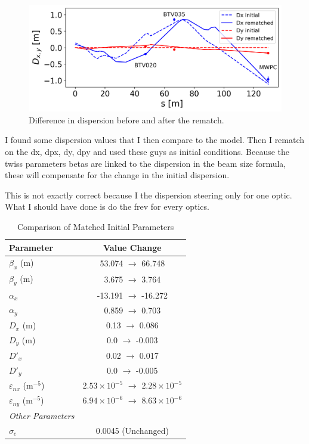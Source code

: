 \documentclass[a4paper,
               biblatex,     %
               ]{jacow}
\begin{document}
\begin{figure}[!htb]
   \centering
   \includegraphics*[width=1.0\columnwidth]{dispersion_diff.png}
   \caption{Difference in dispersion before and after the rematch.}
   \label{fig:dispersion}
\end{figure}

I found some dispersion values that I then compare to the model. Then I rematch on the dx, dpx, dy, dpy and used these guys as initial conditions. Because the twiss parameters betas are linked to the dispersion in the beam size formula, these will compensate for the change in the initial dispersion.

This is not exactly correct because I the dispersion steering only for one optic. What I should have done is do the frev for every optics.

\begin{table}[h!]
    \centering
    \caption{Comparison of Matched Initial Parameters}
    \label{tab:initial_conditions_comparison_single_col}
    \begin{tabular}{l c}
        \hline
        Parameter & Value Change \\
        \hline
        $\beta_x$ (m) & 53.074 \(\rightarrow\) 66.748 \\
        $\beta_y$ (m) & 3.675 \(\rightarrow\) 3.764 \\
        $\alpha_x$ & -13.191 \(\rightarrow\) -16.272 \\
        $\alpha_y$ & 0.859 \(\rightarrow\) 0.703 \\
        $D_x$ (m) & 0.13 \(\rightarrow\) 0.086 \\
        $D_y$ (m) & 0.0 \(\rightarrow\) -0.003 \\
        $D'_x$ & 0.02 \(\rightarrow\) 0.017 \\
        $D'_y$ & 0.0 \(\rightarrow\) -0.005 \\
        $\varepsilon_{nx}$ ($\text{m}^{-5}$) & $2.53 \times 10^{-5}$ \(\rightarrow\) $2.28 \times 10^{-5}$ \\
        $\varepsilon_{ny}$ ($\text{m}^{-5}$) & $6.94 \times 10^{-6}$ \(\rightarrow\) $8.63 \times 10^{-6}$ \\
        \hline
        \textit{Other Parameters} & \\
        \hline
        $\sigma_e$ & 0.0045 (Unchanged) \\
        \hline
    \end{tabular}
\end{table}
\end{document}
